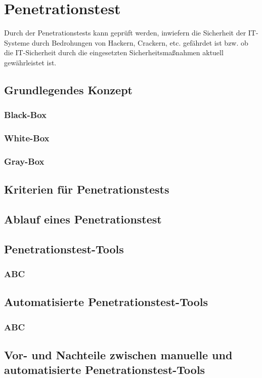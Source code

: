 \chapter{Penetrationstest}
\label{chap:k4}

Durch der Penetrationstests kann geprüft werden, inwiefern die Sicherheit der IT-Systeme durch Bedrohungen von Hackern, Crackern, etc. gefährdet ist bzw. ob die IT-Sicherheit durch die eingesetzten Sicherheitsmaßnahmen aktuell gewährleistet ist. 

\section{Grundlegendes Konzept}

\subsection{Black-Box}

\subsection{White-Box}

\subsection{Gray-Box}

\section{Kriterien für Penetrationstests}

\section{Ablauf eines Penetrationstest}

\section{Penetrationstest-Tools}

\subsection{ABC}

\section{Automatisierte Penetrationstest-Tools}

\subsection{ABC}

\section{Vor- und Nachteile zwischen manuelle und automatisierte Penetrationstest-Tools}